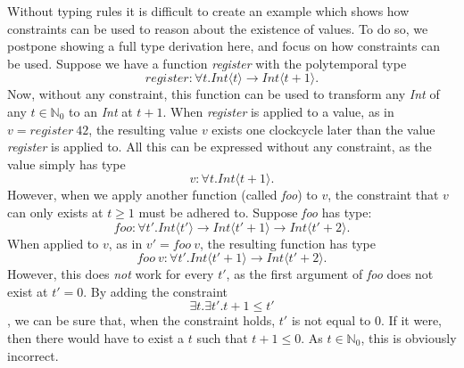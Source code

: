 Without typing rules it is difficult to create an example which shows how constraints can be used to reason about the existence of values.
To do so, we postpone showing a full type derivation here, and focus on how constraints can be used.
Suppose we have a function \textit{register} with the polytemporal type 
\[\textit{register} : \forall t. \textit{Int}\langle t \rangle \to \textit{Int}\langle t + 1 \rangle.\]
Now, without any constraint, this function can be used to transform any \textit{Int} of any $t \in \mathbb{N}_0$ to an \textit{Int} at $t+1$.
When \textit{register} is applied to a value, as in $v = \textit{register} \: 42$, the resulting value $v$ exists one clockcycle later than the value \textit{register} is applied to.
All this can be expressed without any constraint, as the value simply has type 
\[v : \forall t. \textit{Int}\langle t + 1 \rangle.\]
However, when we apply another function (called \textit{foo}) to $v$, the constraint that $v$ can only exists at $t \geq 1$ must be adhered to.
Suppose \textit{foo} has type: \[\textit{foo} : \forall t'. \textit{Int}\langle t' \rangle \to \textit{Int}\langle t' + 1 \rangle \to \textit{Int}\langle t' + 2 \rangle.\]
When applied to $v$, as in $v' = \textit{foo} \: v$, the resulting function has type \[\textit{foo} \: v : \forall t'. \textit{Int}\langle t' + 1 \rangle \to \textit{Int}\langle t' + 2 \rangle.\]
However, this does \textit{not} work for every $t'$, as the first argument of \textit{foo} does not exist at $t' = 0$.
By adding the constraint \[\exists t. \exists t'. t + 1 \leq t'\], we can be sure that, when the constraint holds, $t'$ is not equal to $0$.
If it were, then there would have to exist a $t$ such that $t+1 \leq 0$. 
As $t \in \mathbb{N}_0$, this is obviously incorrect.

